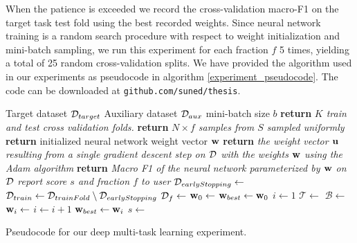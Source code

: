 When the patience is exceeded we record the cross-validation macro-F1 on the target task test fold using the best recorded weights. Since neural network training is a random search procedure with respect to weight initialization and mini-batch sampling, we run this experiment for each fraction $f$ 5 times, yielding a total of 25 random cross-validation splits. We have provided the algorithm used in our experiments as pseudocode in algorithm \ref{experiment_pseudocode}. The code can be downloaded at \texttt{github.com/suned/thesis}.
\begin{algorithm}
\begin{algorithmic}
	\Require Target dataset $\mathcal{D}_{target}$
	\Require Auxiliary dataset $\mathcal{D}_{aux}$
	\Require mini-batch size $b$
		\State \textbf{return} \textit{$K$ train and test cross validation folds.}
	\EndFunction
		\State \textbf{return} \textit{$N \times f$ samples from $S$ sampled uniformly}
	\EndFunction
		\State \textbf{return} initialized neural network weight vector $\mathbf{w}$
	\EndFunction
		\State \textbf{return} \textit{the weight vector $\mathbf{u}$ resulting from a single gradient descent step on $\mathcal{D}$ with the weights $\mathbf{w}$ using the Adam algorithm}
	\EndFunction
		\State \textbf{return} \textit{Macro F1 of the neural network parameterized by $\mathbf{w}$ on $\mathcal{D}$}
	\EndFunction
		\State \textit{report score $s$ and fraction $f$ to user}
	\EndFunction
				\State $\mathcal{D}_{earlyStopping} \gets$ 
				\State $\mathcal{D}_{train} \gets \mathcal{D}_{trainFold} \setminus \mathcal{D}_{earlyStopping}$
				\State $\mathcal{D}_{f} \gets $ 
				\State $\mathbf{w}_0 \gets$ 
				\State $\mathbf{w}_{best} \gets \mathbf{w}_0$
				\State $i \gets 1$
					\State $\mathcal{T} \gets$ 
					\State $\mathcal{B} \gets$ 
					\State $\mathbf{w}_i \gets$ 
					\State $i \gets i + 1$
						\State $\mathbf{w}_{best} \gets \mathbf{w}_i$
					\EndIf
				\EndWhile
				\State $s \gets$ 
				\State {}
			\EndFor
		\EndFor
	\EndFor
\end{algorithmic}
\caption{Pseudocode for our deep multi-task learning experiment.}
\label{experiment_pseudocode}
\end{algorithm}
